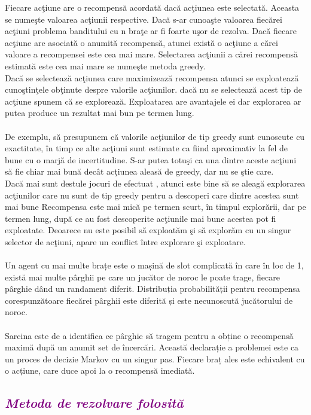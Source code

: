 \documentclass{article}
\begin{document}
Fiecare acţiune are o recompensă acordată dacă acţiunea este selectată. Aceasta se numeşte valoarea acţiunii  respective. Dacă s-ar cunoaşte valoarea fiecărei acţiuni problema banditului cu n braţe ar fi foarte uşor de rezolva. Dacă fiecare acţiune are asociată o anumită recompensă, atunci există o acţiune a cărei valoare a recompensei este cea mai mare. Selectarea acţiunii a cărei  recompensă estimată este cea mai mare se numeşte metoda greedy.\\
Dacă se selectează acţiunea care maximizează recompensa atunci se exploatează cunoştinţele obţinute despre valorile acţiunilor. dacă nu se selectează acest tip de acţiune spunem că se explorează. Exploatarea are avantajele ei dar explorarea ar putea produce un rezultat mai bun pe termen lung. \\\\ 
De exemplu, să presupunem că valorile acţiunilor de tip greedy sunt cunoscute cu exactitate, în timp ce alte acţiuni sunt estimate ca fiind aproximativ la fel de bune cu o marjă de incertitudine. S-ar putea totuşi ca una dintre aceste acţiuni să fie chiar mai bună decât acţiunea aleasă de greedy, dar nu se ştie care.\\
Dacă mai sunt destule jocuri de efectuat , atunci este bine să se aleagă explorarea acţiunilor care nu sunt de tip greedy pentru a descoperi care dintre acestea sunt mai bune  Recompensa este mai mică pe termen scurt, în timpul explorării, dar pe termen lung, după ce au fost descoperite acţiunile mai bune acestea pot fi exploatate. Deoarece nu este posibil să exploatăm şi să explorăm cu un singur selector de acţiuni, apare un conflict între explorare şi exploatare. \\\\ 
Un agent cu mai multe brațe este o mașină de slot complicată în care în loc de 1, există mai multe pârghii pe care un jucător de noroc le poate trage, fiecare pârghie dând un randament diferit. 
Distribuția probabilității pentru recompensa corespunzătoare fiecărei pârghii este diferită și este necunoscută jucătorului de noroc.\\\\ 
Sarcina este de a identifica ce pârghie să tragem pentru a obține o recompensă maximă după un anumit set de încercări. Această declarație a problemei este ca un proces de decizie Markov cu un singur pas. 
Fiecare braț ales este echivalent cu o acțiune, care duce apoi la o recompensă imediată.\\
\textcolor{purple}{\subsection{\itshape \textcolor{purple}{ Metoda de rezolvare folosită}}}
\end{document}
